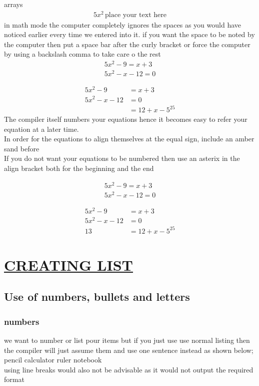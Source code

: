 \documentclass[a4paper,12pt]{article}
\begin{document}
  		
  		 	arrays
  		 	\begin{align*}
  		 		5x^2 \, \text{place your text here}
  		 		\end{align*}
  		 		in math mode the computer completely ignores the spaces as you would have noticed earlier every time we entered into it. if you want the space to be noted by the computer then put a space bar after the curly bracket or force the computer by using a backslash comma to take care o the rest\\
  		 	
  	\begin{align}
  		5x^2-9=x+3\\
  		5x^2-x-12=0
  	\end{align}
  		 
  		 	
  	\begin{align*}
  		 		5x^2-9 &=x+3\\
  		 		5x^2-x-12 & =0\\
  		 		&=12+x-5^25
  	\end{align*}
  	The compiler itself numbers your equations hence it becomes easy to refer your equation at a later time.\\	 	
  	In order for the equations to align themselves at the equal sign, include an amber sand
  	before\\ 
  	If you do not want your equations to be numbered then use an asterix in the align bracket both for the beginning and the end
  	
  		\begin{align}
  		5x^2-9=x+3\\
  		5x^2-x-12=0
  	\end{align}
  	 
  	 \begin{align*}
  	 5x^2-9 &=x+3\\
  	 5x^2-x-12 & =0\\
  	13 &=12+x-5^25
  	 \end{align*}
  	 
  	 
  	 
  	 \section{\underline{CREATING LIST}}
  	 \subsection{Use of numbers, bullets and letters}
  	 \subsubsection{numbers}
  	 we want to number or list pour items but if you just use use normal listing then the compiler will just assume them and use one sentence instead as shown below;
  	 pencil
  	 calculator
  	 ruler
  	 notebook\\
  	 using line breaks would also not be advisable as it would  not output the required format
  	 
\end{document}
